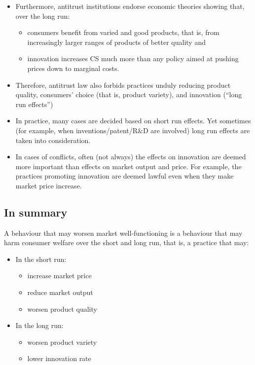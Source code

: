 
    \begin{itemize}
        \item Furthermore, antitrust institutions endorse economic theories showing that, over the long run:
            \begin{itemize}
                \item consumers benefit from varied and good products, that is, from increasingly larger ranges of products of better quality and
                \item innovation increases CS much more than any policy aimed at pushing prices down to marginal costs.
            \end{itemize}
        \item Therefore, antitrust law also forbids practices unduly reducing product quality, consumers’ choice (that is, product variety), and innovation (“long run effects”)
        \item In practice, many cases are decided based on short run effects. Yet sometimes (for example, when inventions/patent/R\&D are involved) long run effects are taken into consideration.
        \item In cases of conflicts, often (not always) the effects on innovation are deemed more important than effects on market output and price. For example, the practices promoting innovation are deemed lawful even when they make market price increase. 
    \end{itemize}

    \subsection{In summary}

        A behaviour that may worsen market well-functioning is a behaviour that may harm consumer welfare over the short and long run, that is, a practice that may:

        \begin{itemize}
            \item In the short run:
                \begin{itemize}
                    \item increase market price
                    \item reduce market output
                    \item worsen product quality
                \end{itemize}
            \item In the long run:
                \begin{itemize}
                    \item worsen product variety
                    \item lower innovation rate
                \end{itemize}
        \end{itemize}

